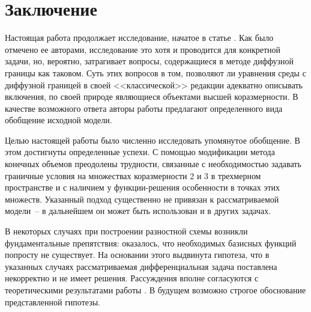 
\section{Заключение}

Настоящая работа продолжает исследование, начатое в статье \cite{zipunova_higher_codimension}. Как было отмечено ее авторами, исследование это хотя и проводится для конкретной задачи, но, вероятно, затрагивает вопросы, содержащиеся в методе диффузной границы как таковом. Суть этих вопросов в том, позволяют ли уравнения среды с диффузной границей в своей <<классической>> редакции адекватно описывать включения, по своей природе являющиеся объектами высшей коразмерности. В качестве возможного ответа авторы работы \cite{zipunova_higher_codimension} предлагают определенного вида обобщение исходной модели.

Целью настоящей работы было численно исследовать упомянутое обобщение. В этом достигнуты определенные успехи. С помощью модификации метода конечных объемов преодолены трудности, связанные с необходимостью задавать граничные условия на множествах коразмерности 2 и 3 в трехмерном пространстве и с наличием у функции-решения  особенности в точках этих множеств. Указанный подход существенно не привязан к рассматриваемой модели~-- в дальнейшем он может быть использован и в других задачах.

В некоторых случаях при построении разностной схемы возникли фундаментальные препятствия: оказалось, что необходимых базисных функций попросту не существует. На основании этого выдвинута гипотеза, что в указанных случаях рассматриваемая дифференциальная задача поставлена некорректно и не имеет решения. Рассуждения вполне согласуются с теоретическими результатами работы \cite{zipunova_higher_codimension}. В будущем возможно строгое обоснование представленной гипотезы.